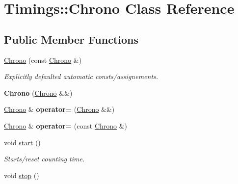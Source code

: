 \hypertarget{classTimings_1_1Chrono}{
\section{Timings::Chrono Class Reference}
\label{classTimings_1_1Chrono}
}
\subsection*{Public Member Functions}
\begin{DoxyCompactItemize}
\item 
\hypertarget{classTimings_1_1Chrono_ad6f26c8e4b1e0835e64111539539f790}{
\hyperlink{classTimings_1_1Chrono_ad6f26c8e4b1e0835e64111539539f790}{Chrono} (const \hyperlink{classTimings_1_1Chrono}{Chrono} \&)}
\label{classTimings_1_1Chrono_ad6f26c8e4b1e0835e64111539539f790}

\begin{DoxyCompactList}\small\item\em Explicitly defaulted automatic consts/assignements. \item\end{DoxyCompactList}\item 
\hypertarget{classTimings_1_1Chrono_a6ec606516a51e26069a8fb954f9f3a17}{
{\bfseries Chrono} (\hyperlink{classTimings_1_1Chrono}{Chrono} \&\&)}
\label{classTimings_1_1Chrono_a6ec606516a51e26069a8fb954f9f3a17}

\item 
\hypertarget{classTimings_1_1Chrono_a849fee8b2d99488eee4e83c774079557}{
\hyperlink{classTimings_1_1Chrono}{Chrono} \& {\bfseries operator=} (\hyperlink{classTimings_1_1Chrono}{Chrono} \&\&)}
\label{classTimings_1_1Chrono_a849fee8b2d99488eee4e83c774079557}

\item 
\hypertarget{classTimings_1_1Chrono_a3a2307eff53e845add3236149cf4ed0b}{
\hyperlink{classTimings_1_1Chrono}{Chrono} \& {\bfseries operator=} (const \hyperlink{classTimings_1_1Chrono}{Chrono} \&)}
\label{classTimings_1_1Chrono_a3a2307eff53e845add3236149cf4ed0b}

\item 
\hypertarget{classTimings_1_1Chrono_aefe8228cdb096ba44351f0cfa729745d}{
void \hyperlink{classTimings_1_1Chrono_aefe8228cdb096ba44351f0cfa729745d}{start} ()}
\label{classTimings_1_1Chrono_aefe8228cdb096ba44351f0cfa729745d}

\begin{DoxyCompactList}\small\item\em Starts/reset counting time. \item\end{DoxyCompactList}\item 
\hypertarget{classTimings_1_1Chrono_a4f3e8cc48b33ec4fa0fe2ef160ca9474}{
void \hyperlink{classTimings_1_1Chrono_a4f3e8cc48b33ec4fa0fe2ef160ca9474}{stop} ()}
\label{classTimings_1_1Chrono_a4f3e8cc48b33ec4fa0fe2ef160ca9474}


\end{DoxyCompactItemize}
